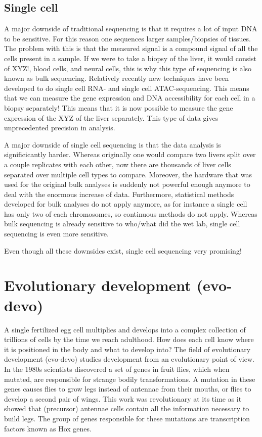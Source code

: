 \subsection{Single cell}

A major downside of traditional sequencing is that it requires a lot of input DNA to be sensitive. For this reason one sequences larger samples/biopsies of tissues. The problem with this is that the measured signal is a compound signal of all the cells present in a sample. If we were to take a biopsy of the liver, it would consist of XYZ!, blood cells, and neural cells, this is why this type of sequencing is also known as bulk sequencing. Relatively recently new techniques have been developed to do single cell RNA- and single cell ATAC-sequencing. This means that we can measure the gene expression and DNA accessibility for each cell in a biopsy separately! This means that it is now possible to measure the gene expression of the XYZ of the liver separately. This type of data gives unprecedented precision in analysis.

A major downside of single cell sequencing is that the data analysis is significicantly harder. Whereas originally one would compare two livers split over a couple replicates with each other, now there are thousands of liver cells separated over multiple cell types to compare. Moreover, the hardware that was used for the original bulk analyses is suddenly not powerful enough anymore to deal with the enormous increase of data. Furthermore, statistical methods developed for bulk analyses do not apply anymore, as for instance a single cell has only two of each chromosomes, so continuous methods do not apply. Whereas bulk sequencing is already sensitive to who/what did the wet lab, single cell sequencing is even more sensitive.

Even though all these downsides exist, single cell sequencing very promising!

\section{Evolutionary development (evo-devo)}

A single fertilized egg cell multiplies and develops into a complex collection of trillions of cells by the time we reach adulthood. How does each cell know where it is positioned in the body and what to develop into? The field of evolutionary development (evo-devo) studies development from an evolutionary point of view. In the 1980s scientists discovered a set of genes in fruit flies, which when mutated, are responsible for strange bodily transformations. A mutation in these genes causes flies to grow legs instead of antennae from their mouths\cite{Schneuwly1987}, or flies to develop a second pair of wings\cite{Weatherbee1998}. This work was revolutionary at its time as it showed that (precursor) antennae cells contain all the information necessary to build legs. The group of genes responsible for these mutations are transcription factors  known as Hox genes.

